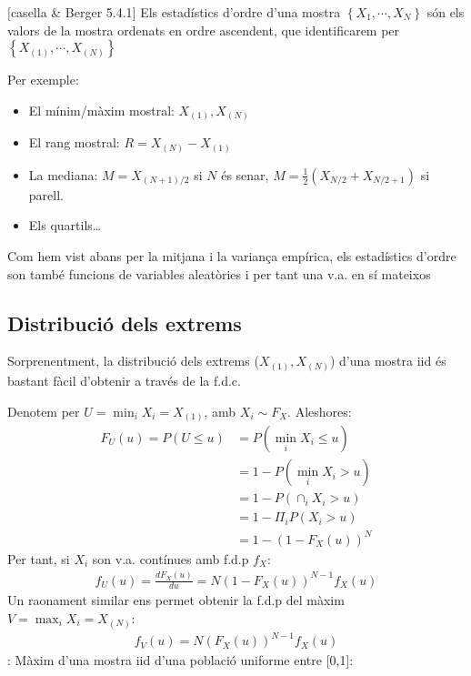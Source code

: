 \documentclass[letterpaper,10pt,english]{sphinxmanual}
\begin{document}
{[}casella \& Berger 5.4.1{]} Els estadístics d’ordre d’una mostra \(\left\{X_1, \cdots, X_N\right\}\)
són els valors de la mostra ordenats en ordre ascendent, que identificarem per \(\left\{X_{(1)}, \cdots, X_{(N)}\right\}\)

Per exemple:
\begin{itemize}
\item {} 
El mínim/màxim mostral: \(X_{(1)}, X_{(N)}\)

\item {} 
El rang mostral: \(R = X_{(N)} - X_{(1)}\)

\item {} 
La mediana: \(M = X_{(N+1)/2}\) si \(N\) és senar, \(M = \frac{1}{2}(X_{N/2} + X_{N/2 + 1})\) si parell.

\item {} 
Els quartils…

\end{itemize}

Com hem vist abans per la mitjana i la variança empírica, els estadístics d’ordre son també funcions de variables aleatòries i per tant una v.a. en sí mateixos


\subsection{Distribució dels extrems}
\label{\detokenize{0_Intro/0_2_Intro_stats:distribucio-dels-extrems}}
Sorprenentment, la distribució dels extrems (\(X_{(1)}, X_{(N)}\))
d’una mostra iid és bastant fàcil d’obtenir a través de la f.d.c.

Denotem per \(U = \min_i X_i = X_{(1)}\), amb \(X_i \sim F_X\). Aleshores:
\begin{equation*}
\begin{split}F_U(u) = P(U \leq u) &= P(\min_i X_i \leq u) \\
                     &= 1 - P(\min_i X_i > u) \\
                     &= 1 - P(\cap_i X_i > u) \\
                     &= 1 - \Pi_i P(X_i > u) \\
                     &= 1 - \left(1 - F_X(u)\right)^N\end{split}
\end{equation*}
Per tant, si \(X_i\) son v.a. contínues amb f.d.p \(f_X\):
\begin{equation*}
\begin{split}f_U(u) = \frac{d F_X(u)}{du} = N\left(1 - F_X(u)\right)^{N-1}f_X(u)\end{split}
\end{equation*}
Un raonament similar ens permet obtenir la f.d.p del màxim \(V = \max_i X_i = X_{(N)}\):
\begin{equation*}
\begin{split}f_V(u) =  N\left(F_X(u)\right)^{N-1}f_X(u)\end{split}
\end{equation*}
: Màxim d’una mostra iid d’una població uniforme entre {[}0,1{]}:
\end{document}
